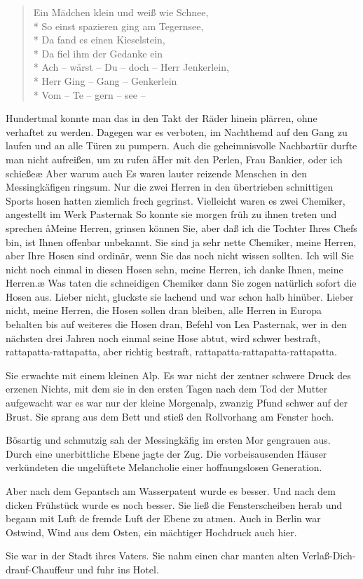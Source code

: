 \begin{verse}Ein Mädchen klein und weiß wie Schnee,\\*
So einst spazieren ging am Tegernsee,\\*
Da fand es einen Kieselstein,\\*
Da fiel ihm der Gedanke ein\dopp{}\\*
Ach -- wärst -- Du -- doch -- Herr Jenkerlein,\\*
Herr Ging -- Gang -- Genkerlein\\*
Vom -- Te -- gern -- see --
\end{verse}

\noindent{}Hundertmal konnte man das in den Takt der Räder hinein\-%
plärren, ohne verhaftet zu werden. Dagegen war es verboten,
im Nachthemd auf den Gang zu laufen und an alle Türen
zu pumpern. Auch die geheimnisvolle Nachbartür durfte
man nicht aufreißen, um zu rufen\dopp{} \aa{}Her mit den Perlen, Frau
Bankier, oder ich schieße\ausr{}\ae{} Aber warum auch\frag{} Es waren
lauter reizende Menschen in den Messingkäfigen ringsum.
Nur die zwei Herren in den übertrieben schnittigen Sports\-%
hosen hatten ziemlich frech gegrinst. Vielleicht waren es zwei
Chemiker, angestellt im Werk Pasternak\frag{} So konnte sie morgen
früh zu ihnen treten und sprechen\dopp{} \aa{}Meine Herren, grinsen
können Sie, aber daß ich die Tochter Ihres Chefs bin, ist
Ihnen offenbar unbekannt. Sie sind ja sehr nette Chemiker,
meine Herren, aber Ihre Hosen sind ordinär, wenn Sie das
noch nicht wissen sollten. Ich will Sie nicht noch einmal in
diesen Hosen sehn, meine Herren, ich danke Ihnen, meine
Herren.\ae{} Was taten die schneidigen Chemiker dann\frag{} Sie
zogen natürlich sofort die Hosen aus. Lieber nicht, gluckste
sie lachend und war schon halb hinüber. Lieber nicht, meine
Herren, die Hosen sollen dran bleiben, alle Herren in Europa
behalten bis auf weiteres die Hosen dran, Befehl von Lea
Pasternak, wer in den nächsten drei Jahren noch einmal seine
Hose abtut, wird schwer bestraft, rattapatta-rattapatta, aber
richtig bestraft, rattapatta-rattapatta-rattapatta.

Sie erwachte mit einem kleinen Alp. Es war nicht der zentner\-%
schwere Druck des erzenen Nichts, mit dem sie in den ersten
Tagen nach dem Tod der Mutter aufgewacht war\semi{} es war
nur der kleine Morgenalp, zwanzig Pfund schwer auf der
Brust. Sie sprang aus dem Bett und stieß den Rollvorhang
am Fenster hoch.

Bösartig und schmutzig sah der Messingkäfig im ersten Mor\-%
gengrauen aus. Durch eine unerbittliche Ebene jagte der Zug.
Die vorbeisausenden Häuser verkündeten die ungelüftete
Melancholie einer hoffnungslosen Generation.

Aber nach dem Gepantsch am Wasserpatent wurde es besser.
Und nach dem dicken Frühstück wurde es noch besser. Sie ließ
die Fensterscheiben herab und begann mit Luft de fremde
Luft der Ebene zu atmen. Auch in Berlin war Ostwind, Wind
aus dem Osten, ein mächtiger Hochdruck auch hier.

Sie war in der Stadt ihres Vaters. Sie nahm einen char\-%
manten alten Verlaß-Dich-drauf-Chauffeur und fuhr ins
Hotel.